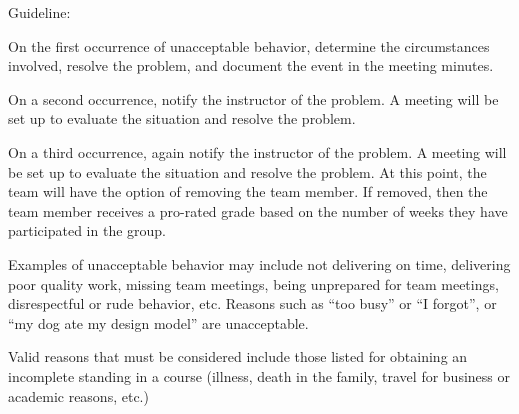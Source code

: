 \documentclass[11pt]{article}
\begin{document}
Guideline:

On the first occurrence of unacceptable behavior, determine the circumstances involved, resolve the problem, and document the event in the meeting minutes.

On a second occurrence, notify the instructor of the problem. A meeting will be set up to evaluate the situation and resolve the problem.

On a third occurrence, again notify the instructor of the problem. A meeting will be set up to evaluate the situation and resolve the problem. At this point, the team will have the option of removing the team member. If removed, then the team member receives a pro-rated grade based on the number of weeks they have participated in the group.

Examples of unacceptable behavior may include not delivering on time, delivering poor quality work, missing team meetings, being unprepared for team meetings, disrespectful or rude behavior, etc. Reasons such as “too busy” or “I forgot”, or “my dog ate my design model” are unacceptable.

Valid reasons that must be considered include those listed for obtaining an incomplete standing in a course (illness, death in the family, travel for business or academic reasons, etc.)
\end{document}
